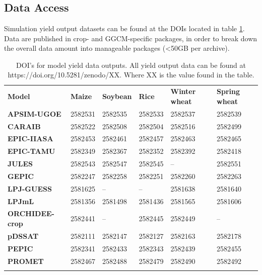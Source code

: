 \documentclass[gmd, manuscript]{copernicus} %
\begin{document}
\appendix
\section{}
\subsection{Data Access}
\label{A:1}
Simulation yield output datasets can be found at the DOIs located in table \ref{table:dataloc}. 
Data are published in crop- and GGCM-specific packages, in order to break down the overall data amount into manageable packages (<50GB per archive).

\begin{table}[t]
\caption{DOI's for model yield data outputs. All yield output data can be found at https://doi.org/10.5281/zenodo/XX. Where XX is the value found in the table.} 
\label{table:dataloc}
	\begin{tabular}{p{3cm} p{1.5cm} p{1.5cm} p{1.5cm} p{1.5cm} p{1.5cm}}
        \tophline
        {\textbf{Model}}&{\textbf{Maize}}&{\textbf{Soybean}}&{\textbf{Rice}}&{\textbf{Winter wheat}}&{\textbf{Spring wheat}}\\ \middlehline
        {\textbf{APSIM-UGOE}} & {2582531} & {2582535} & {2582533} & {2582537} & {2582539}\\ \middlehline
        {\textbf{CARAIB}} & {2582522} & {2582508} & {2582504} & {2582516} & {2582499}\\ \middlehline
        {\textbf{EPIC-IIASA}} & {2582453} & {2582461} & {2582457} & {2582463} & {2582465}\\  \middlehline
        {\textbf{EPIC-TAMU}} & {2582349} & {2582367} & {2582352} & {2582392} & {2582418}\\ \middlehline
        {\textbf{JULES}} & {2582543} & {2582547} & {2582545} & {--} & {2582551}\\ \middlehline
        {\textbf{GEPIC}} & {2582247} & {2582258} & {2582251} & {2582260} & {2582263}\\ \middlehline
        {\textbf{LPJ-GUESS}} & {2581625} & {--} & {--} & {2581638} & {2581640}\\  \middlehline
        {\textbf{LPJmL}} & {2581356} & {2581498} & {2581436} & {2581565} & {2581606}\\ \middlehline
        {\textbf{ORCHIDEE-crop}} & {2582441} & {--} & {2582445} & {2582449} & {--}\\ \middlehline
        {\textbf{pDSSAT}} & {2582111} & {2582147} & {2582127} & {2582163} & {2582178}\\ \middlehline
        {\textbf{PEPIC}} & {2582341} & {2582433} & {2582343} & {2582439} & {2582455}\\ \middlehline
        {\textbf{PROMET}} & {2582467} & {2582488} & {2582479} & {2582490} & {2582492}\\
        \bottomhline
    \end{tabular}
\end{table}
\noappendix %
\end{document}
